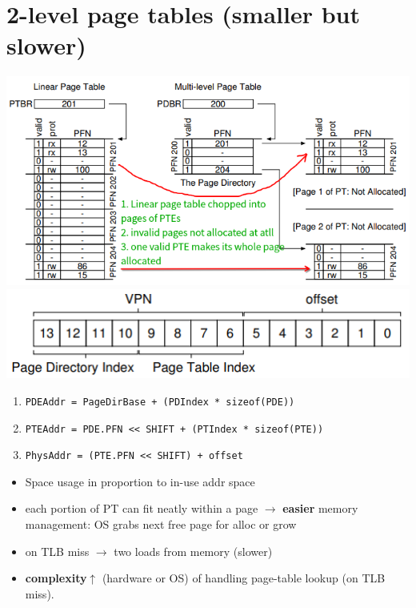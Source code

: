 \section*{2-level page tables (smaller but slower)}
\includegraphics[width=\linewidth]{imgs/multi_level_pt}
\includegraphics[width=\linewidth]{imgs/two_level_pt}
\begin{enumerate}
\item \texttt{PDEAddr = PageDirBase + (PDIndex * sizeof(PDE))}
\item \texttt{PTEAddr = PDE.PFN << SHIFT + (PTIndex * sizeof(PTE))}
\item \texttt{PhysAddr = (PTE.PFN << SHIFT) + offset}
\end{enumerate}
\begin{minipage}{.5\linewidth}
  \flushleft
  \begin{itemize}
  \item Space usage in proportion to in-use addr space
  \item each portion of PT can fit neatly within a page $\to$ \textbf{easier} memory management: OS grabs next free page for alloc or grow
  \end{itemize}
\end{minipage}
\begin{minipage}{.5\linewidth}
  \flushleft
  \begin{itemize}
  \item on TLB miss $\to$ two loads from memory (slower)
  \item \textbf{complexity}$\uparrow$ (hardware or OS) of handling page-table lookup (on TLB miss).
  \end{itemize}
\end{minipage}

